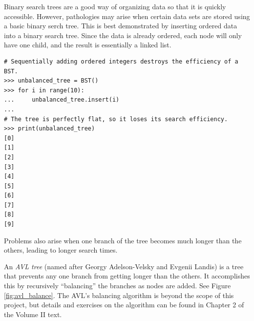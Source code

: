 Binary search trees are a good way of organizing data so that it is quickly accessible.
However, pathologies may arise when certain data sets are stored using a basic binary serch tree.
This is best demonstrated by inserting ordered data into a binary search tree.
Since the data is already ordered, each node will only have one child, and the result is essentially a linked list.

\begin{lstlisting}
# Sequentially adding ordered integers destroys the efficiency of a BST.
>>> unbalanced_tree = BST()
>>> for i in range(10):
...     unbalanced_tree.insert(i)
...
# The tree is perfectly flat, so it loses its search efficiency.
>>> print(unbalanced_tree)
[0]
[1]
[2]
[3]
[4]
[5]
[6]
[7]
[8]
[9]
\end{lstlisting}

Problems also arise when one branch of the tree becomes much longer than the others, leading to longer search times.

An \emph{AVL tree} (named after Georgy Adelson-Velsky and Evgenii Landis) is a tree that prevents any one branch from getting longer than the others.
It accomplishes this by recursively ``balancing'' the branches as nodes are added.
See Figure \ref{fig:avl_balance}.
The AVL's balancing algorithm is beyond the scope of this project, but details and exercises on the algorithm can be found in Chapter 2 of the Volume II text.

